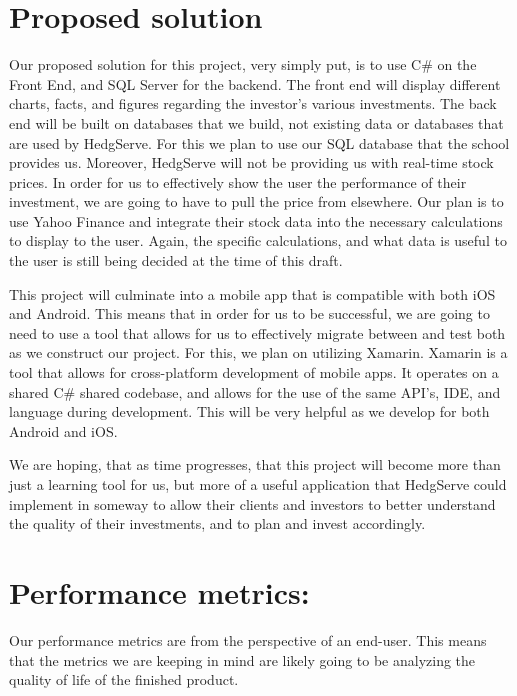 \documentclass[letterpaper,10pt]{article}
\begin{document}
\section{Proposed solution}
Our proposed solution for this project, very simply put, is to use C\# on the Front End, and SQL Server for the backend. The front end will display different charts, facts, and figures regarding the investor’s various investments. The back end will be built on databases that we build, not existing data or databases that are used by HedgServe. For this we plan to use our SQL database that the school provides us. Moreover, HedgServe will not be providing us with real-time stock prices. In order for us to effectively show the user the performance of their investment, we are going to have to pull the price from elsewhere. Our plan is to use Yahoo Finance and integrate their stock data into the necessary calculations to display to the user. Again, the specific calculations, and what data is useful to the user is still being decided at the time of this draft.

This project will culminate into a mobile app that is compatible with both iOS and Android. This means that in order for us to be successful, we are going to need to use a tool that allows for us to effectively migrate between and test both as we construct our project. For this, we plan on utilizing Xamarin. Xamarin is a tool that allows for cross-platform development of mobile apps. It operates on a shared C\# shared codebase, and allows for the use of the same API’s, IDE, and language during development. This will be very helpful as we develop for both Android and iOS. 

We are hoping, that as time progresses, that this project will become more than just a learning tool for us, but more of a useful application that HedgServe could implement in someway to allow their clients and investors to better understand the quality of their investments, and to plan and invest accordingly.

\section{Performance metrics:}

Our performance metrics are from the perspective of an end-user. This means that the metrics we are keeping in mind are likely going to be analyzing the quality of life of the finished product.
\end{document}
